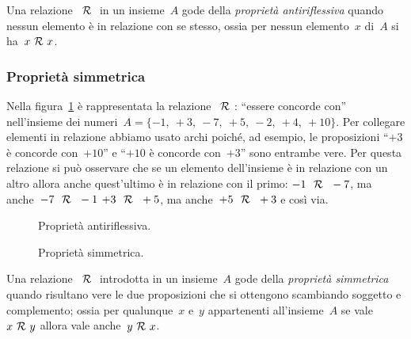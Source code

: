 \begin{definizione}
Una relazione~\(~\mathcal{R}~\) in un insieme~\(A\) gode della \emph{proprietà 
antiriflessiva} quando nessun elemento è in relazione con se stesso,
ossia per nessun elemento~\(x\) di~\(A\) si ha~\(x ~\mathcal{R}~ x\).
\end{definizione}

\subsubsection{Proprietà simmetrica}

 \begin{esempio}
Nella figura~\ref{fig:B.4} è rappresentata la relazione~\(~\mathcal{R}~\): ``essere 
concorde con'' nell'insieme dei 
numeri~\(A = \lbrace -1,~+3,~-7,~+5,~-2,~+4,~+10 \rbrace\).
Per collegare elementi in relazione abbiamo usato archi poiché, ad esempio, le 
proposizioni ``\(+3\) è concorde con~\(+10\)'' e ``\(+10\) è concorde 
con~\(+3\)''
sono entrambe vere. Per questa relazione si può osservare che se un elemento 
dell'insieme è in relazione con un altro allora anche quest'ultimo
è in relazione con il primo:
\(-1~~\mathcal{R}~~-7\), ma anche~\(-7~~\mathcal{R}~~-1\) \(+3~~\mathcal{R}~~+5\), ma 
anche~\(+5~~\mathcal{R}~~+3\) e così 
via.
 \end{esempio}

\begin{inaccessibleblock}
 \begin{figure}[t]
\begin{minipage}[t]{.45\textwidth}
 \centering
 
 \caption{Proprietà antiriflessiva.}\label{fig:B.3}
\end{minipage}\hfil
\begin{minipage}[t]{.45\textwidth}
 \centering
 
 \caption{Proprietà simmetrica.}\label{fig:B.4}
\end{minipage}
\end{figure}
\end{inaccessibleblock}

\begin{definizione}
Una relazione~\(~\mathcal{R}~\) introdotta in un insieme~\(A\) gode della 
\emph{proprietà 
simmetrica} quando risultano vere le due proposizioni
che si ottengono scambiando soggetto e complemento; ossia per qualunque~\(x\) 
e~\(y\) appartenenti all'insieme~\(A\) se vale~\(x ~\mathcal{R}~ y\)
allora vale anche~\(y ~\mathcal{R}~ x\).
\end{definizione}

